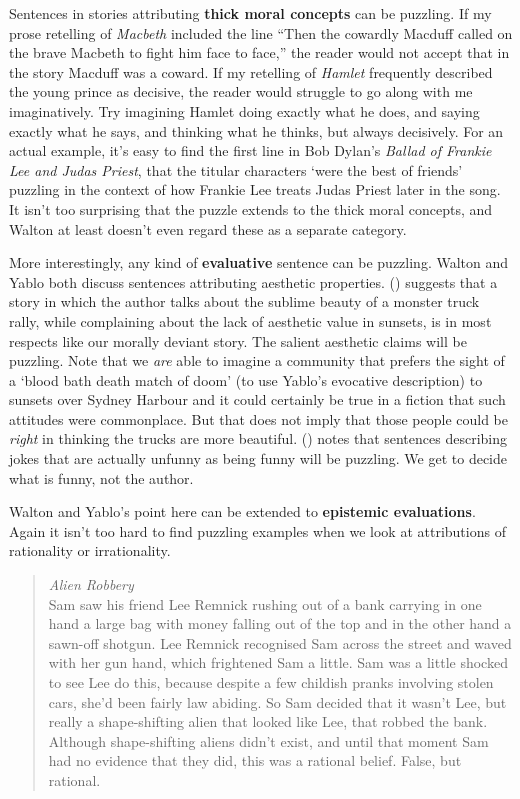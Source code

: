\documentclass[
  10pt,
  letterpaper,
  DIV=11,
  numbers=noendperiod,
  twoside]{scrartcl}
\begin{document}
Sentences in stories attributing \textbf{thick moral concepts} can be
puzzling. If my prose retelling of \emph{Macbeth} included the line
``Then the cowardly Macduff called on the brave Macbeth to fight him
face to face,'' the reader would not accept that in the story Macduff
was a coward. If my retelling of \emph{Hamlet} frequently described the
young prince as decisive, the reader would struggle to go along with me
imaginatively. Try imagining Hamlet doing exactly what he does, and
saying exactly what he says, and thinking what he thinks, but always
decisively. For an actual example, it's easy to find the first line in
Bob Dylan's \emph{Ballad of Frankie Lee and Judas Priest}, that the
titular characters `were the best of friends' puzzling in the context of
how Frankie Lee treats Judas Priest later in the song. It isn't too
surprising that the puzzle extends to the thick moral concepts, and
Walton at least doesn't even regard these as a separate category.

More interestingly, any kind of \textbf{evaluative} sentence can be
puzzling. Walton and Yablo both discuss sentences attributing aesthetic
properties. () suggests that a
story in which the author talks about the sublime beauty of a monster
truck rally, while complaining about the lack of aesthetic value in
sunsets, is in most respects like our morally deviant story. The salient
aesthetic claims will be puzzling. Note that we \emph{are} able to
imagine a community that prefers the sight of a `blood bath death match
of doom' (to use Yablo's evocative description) to sunsets over Sydney
Harbour and it could certainly be true in a fiction that such attitudes
were commonplace. But that does not imply that those people could be
\emph{right} in thinking the trucks are more beautiful.
() notes that sentences
describing jokes that are actually unfunny as being funny will be
puzzling. We get to decide what is funny, not the author.

Walton and Yablo's point here can be extended to \textbf{epistemic
evaluations}. Again it isn't too hard to find puzzling examples when we
look at attributions of rationality or irrationality.

\begin{quote}
\emph{Alien Robbery}\\
Sam saw his friend Lee Remnick rushing out of a bank carrying in one
hand a large bag with money falling out of the top and in the other hand
a sawn-off shotgun. Lee Remnick recognised Sam across the street and
waved with her gun hand, which frightened Sam a little. Sam was a little
shocked to see Lee do this, because despite a few childish pranks
involving stolen cars, she'd been fairly law abiding. So Sam decided
that it wasn't Lee, but really a shape-shifting alien that looked like
Lee, that robbed the bank. Although shape-shifting aliens didn't exist,
and until that moment Sam had no evidence that they did, this was a
rational belief. False, but rational.
\end{quote}
\end{document}
